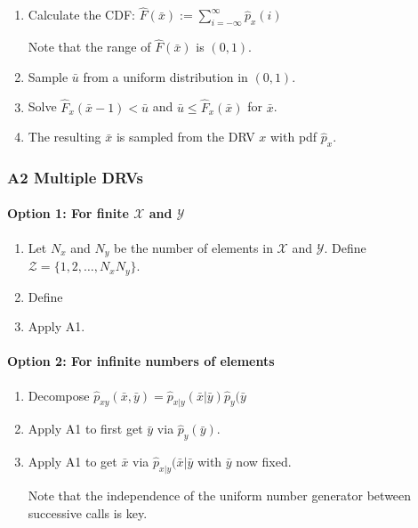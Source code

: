 \documentclass[10pt,a4paper]{scrartcl}
\begin{document}
\begin{multicols*}{2}
\begin{enumerate}
\item Calculate the CDF: $\hat{F}(\bar{x}):=\sum\limits_{i=-\infty}^\infty \hat{p}_x(i)$

Note that the range of $\hat{F}(\bar{x})$ is $(0,1)$.
\item Sample $\bar{u}$ from a uniform distribution in $(0,1)$.
\item Solve $\hat{F}_x(\bar{x}-1)<\bar{u}$ and $\bar{u}\leq \hat{F}_x(\bar{x})$ for $\bar{x}$.
\item The resulting $\bar{x}$ is sampled from the DRV $x$ with pdf $\hat{p}_x$.
\end{enumerate}


\subsubsection{A2 Multiple DRVs}

\paragraph{Option 1: For finite $\mathcal{X}$ and $\mathcal{Y}$}

\begin{enumerate}
\item Let $N_x$ and $N_y$ be the number of elements in $\mathcal{X}$ and $\mathcal{Y}$. Define $\mathcal{Z}=\{1,2,\ldots,N_xN_y\}$.
\item Define
\item Apply A1.
\end{enumerate}

\paragraph{Option 2: For infinite numbers of elements}

\begin{enumerate}
\item Decompose $\hat{p}_{xy}(\bar{x},\bar{y})=\hat{p}_{x|y}(\bar{x}|\bar{y})\hat{p}_y(\bar{y}$
\item Apply A1 to first get $\bar{y}$ via $\hat{p}_y(\bar{y})$.
\item Apply A1 to get $\bar{x}$ via $\hat{p}_{x|y}(\bar{x}|\bar{y}$ with $\bar{y}$ now fixed.

Note that the independence of the uniform number generator between successive calls is key.
\end{enumerate}


\end{multicols*}
\end{document}
